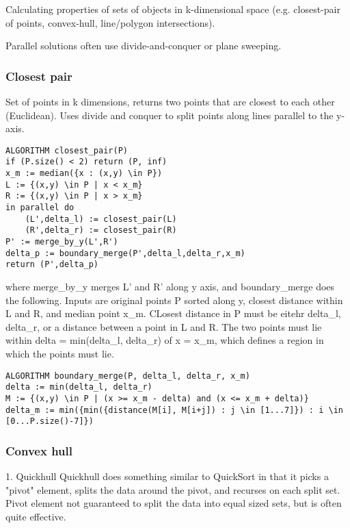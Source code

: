 Calculating properties of sets of objects in k-dimensional space (e.g. closest-pair of points, convex-hull, line/polygon intersections).

Parallel solutions often use divide-and-conquer or plane sweeping. 

\subsubsection{Closest pair}

Set of points in k dimensions, returns two points that are closest to each other (Euclidean). Uses divide and conquer to split points along lines parallel to the y-axis.

\begin{lstlisting}
ALGORITHM closest_pair(P)
if (P.size() < 2) return (P, inf)
x_m := median({x : (x,y) \in P})
L := {(x,y) \in P | x < x_m}
R := {(x,y) \in P | x > x_m}
in parallel do
    (L',delta_l) := closest_pair(L)
    (R',delta_r) := closest_pair(R)
P' := merge_by_y(L',R')
delta_p := boundary_merge(P',delta_l,delta_r,x_m)
return (P',delta_p)
\end{lstlisting}

where merge\_by\_y merges L' and R' along y axis, and boundary\_merge does the following. Inputs are original points P sorted along y, closest distance within L and R, and median point x\_m. CLosest distance in P must be eitehr delta\_l, delta\_r, or a distance between a point in L and R. The two points must lie within delta = min(delta\_l, delta\_r) of x = x\_m, which defines a region in which the points must lie. 

\begin{lstlisting}
ALGORITHM boundary_merge(P, delta_l, delta_r, x_m)
delta := min(delta_l, delta_r)
M := {(x,y) \in P | (x >= x_m - delta) and (x <= x_m + delta)}
delta_m := min({min({distance(M[i], M[i+j]) : j \in [1...7]}) : i \in [0...P.size()-7]})
\end{lstlisting}

\subsubsection{Convex hull}

1. Quickhull
Quickhull does something similar to QuickSort in that it picks a "pivot" element, splits the data around the pivot, and recurses on each split set. Pivot element not guaranteed to split the data into equal sized sets, but is often quite effective. 

